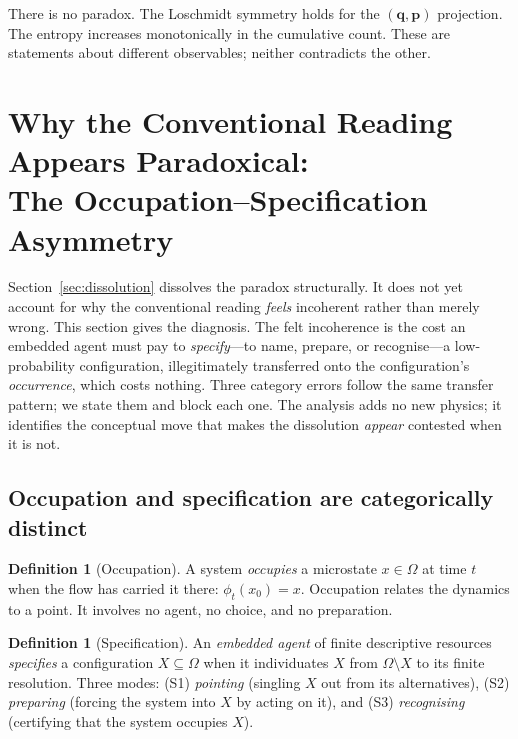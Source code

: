 \documentclass[twocolumn,10pt,a4paper]{article}
\theoremstyle{thmstyle}
\theoremstyle{definition}
\newtheorem{definition}[theorem]{Definition}
\theoremstyle{remark}
\begin{document}
There is no paradox. The Loschmidt symmetry holds for the
$(\mathbf{q},\mathbf{p})$ projection. The entropy increases monotonically
in the cumulative count. These are statements about different
observables; neither contradicts the other.

\section{Why the Conventional Reading Appears Paradoxical:\\
The Occupation--Specification Asymmetry}
\label{sec:occspec}

Section~\ref{sec:dissolution} dissolves the paradox structurally. It
does not yet account for why the conventional reading \emph{feels}
incoherent rather than merely wrong. This section gives the diagnosis.
The felt incoherence is the cost an embedded agent must pay to
\emph{specify}---to name, prepare, or recognise---a low-probability
configuration, illegitimately transferred onto the configuration's
\emph{occurrence}, which costs nothing. Three category errors follow
the same transfer pattern; we state them and block each one. The
analysis adds no new physics; it identifies the conceptual move that
makes the dissolution \emph{appear} contested when it is not.

\subsection{Occupation and specification are categorically distinct}

\begin{definition}[Occupation]
\label{def:occupation}
A system \emph{occupies} a microstate $x\in\Omega$ at time $t$ when
the flow has carried it there: $\phi_{t}(x_{0})=x$. Occupation
relates the dynamics to a point. It involves no agent, no choice, and
no preparation.
\end{definition}

\begin{definition}[Specification]
\label{def:specification}
An \emph{embedded agent} of finite descriptive resources
\emph{specifies} a configuration $X\subseteq\Omega$ when it
individuates $X$ from $\Omega\setminus X$ to its finite resolution.
Three modes: (S1) \emph{pointing} (singling $X$ out from its
alternatives), (S2) \emph{preparing} (forcing the system into $X$ by
acting on it), and (S3) \emph{recognising} (certifying that the
system occupies $X$).
\end{definition}
\end{document}

